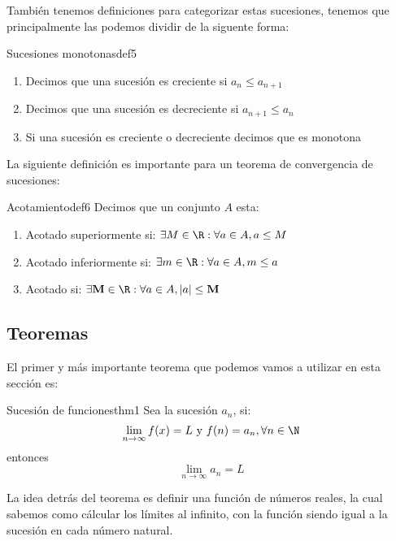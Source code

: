 También tenemos definiciones para categorizar estas sucesiones, tenemos que principalmente las podemos dividir de la siguente forma:

\begin{definicion}{Sucesiones monotonas}{def5}
    \begin{enumerate}
        \item Decimos que una sucesión es creciente si $a_n \leq a_{n + 1}$
        \item Decimos que una sucesión es decreciente si $a_{n + 1} \leq {a_n}$
        \item Si una sucesión es creciente o decreciente decimos que es monotona
    \end{enumerate}
\end{definicion}

La siguiente definición es importante para un teorema de convergencia de sucesiones:

\begin{definicion}{Acotamiento}{def6}
    Decimos que un conjunto $A$ esta:
    \begin{enumerate}
        \item Acotado superiormente si: $\exists M \in \R: \forall a \in A, a \leq M$
        \item Acotado inferiormente si: $\exists m \in \R: \forall a \in A, m \leq a$
        \item Acotado si: $\exists \mathbf{M} \in \R: \forall a \in A, |a| \leq \mathbf{M}$
    \end{enumerate}
\end{definicion}

\subsection{Teoremas}

El primer y más importante teorema que podemos vamos a utilizar en esta sección es:

\begin{teorema}{Sucesión de funciones}{thm1}
    Sea la sucesión $a_n$, si:
    \[ 
        \lim_{n \to \infty} f(x) = L \text{ y } f(n) = a_n, \forall n \in \N
    \]
    entonces
    \[ 
        \lim_{n \to \infty} a_n = L
    \]
\end{teorema}

La idea detrás del teorema es definir una función de números reales, la cual sabemos como cálcular los límites al infinito, con la función siendo igual a la sucesión en cada número natural.\\

